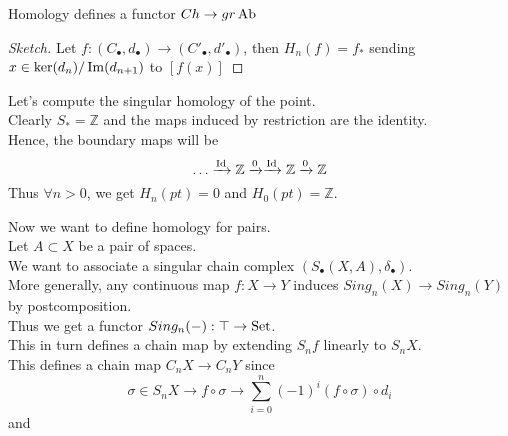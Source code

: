 \documentclass[../main.tex]{subfiles}
\begin{document}
\begin{lemma}
Homology defines a functor $Ch\to gr\operatorname{Ab}$ 
\end{lemma}
\begin{proof}[Sketch]
	Let $f:( C_\bullet, d_\bullet) \to ( C'_{\bullet} , d'_{\bullet} ) $, then $H_n( f) = f_\ast$ sending $x\in \ker( d_n) / \operatorname{Im} ( d_{n+1} )  $ to $[f( x) ]$ 
\end{proof}
\begin{exemple}
Let's compute the singular homology of the point.\\
Clearly $S_\ast = \mathbb{Z}$ and the maps induced by restriction are the identity.\\
Hence, the boundary maps will be
\[ 
	\ldots \xrightarrow{\operatorname{Id}} \mathbb{Z}\xrightarrow{0} \xrightarrow{\operatorname{Id}} \mathbb{Z} \xrightarrow{0} \mathbb{Z}
\]
Thus $\forall n >0$, we get $H_n ( pt) = 0$ and $H_0 ( pt) = \mathbb{Z}$.
\end{exemple}
Now we want to define homology for pairs.\\
Let $A \subset X$ be a pair of spaces.\\
We want to associate a singular chain complex $( S_\bullet( X,A) , \delta_{\bullet} ) $.\\
More generally, any continuous map $f:X\to Y$ induces $Sing_n( X) \to Sing_n( Y) $ by postcomposition.\\
Thus we get a functor $Sing_n( -) : \top \to \operatorname{Set}$.\\
This in turn defines a chain map by extending $S_n f$ linearly to $S_n X$.\\
This defines a chain map $C_n X \to C_n Y$ since
\[ 
\sigma\in S_n X \to f\circ \sigma \to \sum_{i=0}^{ n}( -1)^{i}( f\circ \sigma) \circ d_i
\]
and
\end{document}
